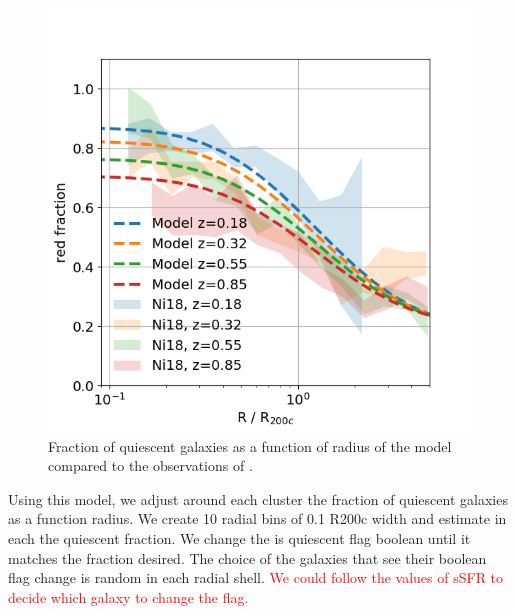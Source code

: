 \documentclass[fleqn,usenatbib,onecolumn]{mnras}
\begin{document}
% 
% 
\begin{figure}
\centering
\includegraphics[width=.8\columnwidth]{figures/frac_QU_radius.png}
\caption{\label{fig:SF:QU:fractions:cluster:radius}Fraction of quiescent galaxies as a function of radius of the model compared to the observations of \citep{2018PASJ...70S..24N}.}
\end{figure}

Using this model, we adjust around each cluster the fraction of quiescent galaxies as a function radius. 
We create 10 radial bins of 0.1 R200c width and estimate in each the quiescent fraction. 
We change the is quiescent flag boolean until it matches the fraction desired. 
The choice of the galaxies that see their boolean flag change is random in each radial shell. 
\textcolor{red}{We could follow the values of sSFR to decide which galaxy to change the flag.}
\end{document}
